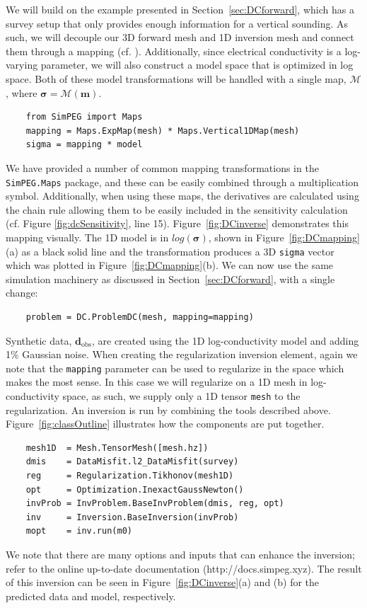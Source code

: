 \documentclass[preprint,review,3p,times,onecolumn,authoryear]{elsarticle}
\newcommand{\dobs}{\mathbf{d}_\text{obs}}
\begin{document}
We will build on the example presented in Section~\ref{sec:DCforward}, which has a survey setup that only provides enough information for a vertical sounding.
As such, we will decouple our 3D forward mesh and 1D inversion mesh and connect them through a mapping (cf. \cite{KangSEG2015}).
Additionally, since electrical conductivity is a log-varying parameter, we will also construct a model space that is optimized in log space.
Both of these model transformations will be handled with a single map, $\mathcal{M}$, where $\boldsymbol{\sigma} = \mathcal{M}(\mathbf{m})$.
{%
{\scriptsize\begin{verbatim}
    from SimPEG import Maps
    mapping = Maps.ExpMap(mesh) * Maps.Vertical1DMap(mesh)
    sigma = mapping * model
\end{verbatim}}
}
\noindent
We have provided a number of common mapping transformations in the \texttt{SimPEG.Maps} package, and these can be easily combined through a
multiplication symbol. Additionally, when using these maps, the derivatives are calculated using the chain rule allowing them to be easily
included in the sensitivity calculation (cf. Figure \ref{fig:dcSensitivity}, line 15). Figure~\ref{fig:DCinverse} demonstrates this mapping visually.
The 1D model is in $log(\boldsymbol{\sigma})$, shown in Figure~\ref{fig:DCmapping}(a) as a black solid line and the transformation produces a 3D \texttt{sigma} vector which was plotted in Figure~\ref{fig:DCmapping}(b). We can now use the same simulation machinery as discussed in Section~\ref{sec:DCforward}, with a single change:
{%
{\scriptsize\begin{verbatim}
    problem = DC.ProblemDC(mesh, mapping=mapping)
\end{verbatim}}
}

Synthetic data, $\dobs$, are created using the 1D log-conductivity model and adding 1\% Gaussian noise.
When creating the regularization inversion element, again we note that the \texttt{mapping} parameter can be used to regularize in the space which makes the most sense. In this case we will regularize on a 1D mesh in log-conductivity space, as such, we supply only a 1D tensor \texttt{mesh} to the regularization.
An inversion is run by combining the tools described above. Figure~\ref{fig:classOutline} illustrates how the components are put together.
{%
{\scriptsize\begin{verbatim}
    mesh1D  = Mesh.TensorMesh([mesh.hz])
    dmis    = DataMisfit.l2_DataMisfit(survey)
    reg     = Regularization.Tikhonov(mesh1D)
    opt     = Optimization.InexactGaussNewton()
    invProb = InvProblem.BaseInvProblem(dmis, reg, opt)
    inv     = Inversion.BaseInversion(invProb)
    mopt    = inv.run(m0)
\end{verbatim}}
}
\noindent
We note that there are many options and inputs that can enhance the inversion; refer to the online up-to-date documentation (http://docs.simpeg.xyz). The result of this inversion can be seen in Figure~\ref{fig:DCinverse}(a) and (b) for the predicted data and model, respectively.
\end{document}
